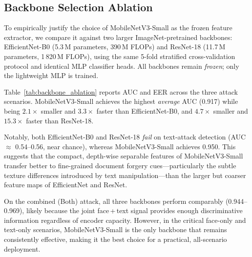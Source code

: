 
\subsection{Backbone Selection Ablation}
\label{sec:backbone_ablation}

To empirically justify the choice of MobileNetV3-Small as the frozen feature
extractor, we compare it against two larger ImageNet-pretrained backbones:
EfficientNet-B0 (5.3\,M parameters, 390\,M FLOPs) and ResNet-18
(11.7\,M parameters, 1\,820\,M FLOPs), using the same 5-fold stratified
cross-validation protocol and identical MLP classifier heads.
All backbones remain \emph{frozen}; only the lightweight MLP is trained.

Table~\ref{tab:backbone_ablation} reports AUC and EER across the three attack
scenarios.  MobileNetV3-Small achieves the highest \emph{average} AUC
(0.917) while being $2.1\times$ smaller and $3.3\times$ faster than
EfficientNet-B0, and $4.7\times$ smaller and $15.3\times$ faster than
ResNet-18.

Notably, both EfficientNet-B0 and ResNet-18 \emph{fail} on text-attack
detection (AUC $\approx$ 0.54--0.56, near chance), whereas MobileNetV3-Small
achieves 0.950.  This suggests that the compact, depth-wise separable
features of MobileNetV3-Small transfer better to fine-grained document
forgery cues---particularly the subtle texture differences introduced by
text manipulation---than the larger but coarser feature maps of EfficientNet
and ResNet.

On the combined (Both) attack, all three backbones perform comparably
(0.944--0.969), likely because the joint face\,+\,text signal provides
enough discriminative information regardless of encoder capacity.  However,
in the critical face-only and text-only scenarios, MobileNetV3-Small is
the only backbone that remains consistently effective, making it the best
choice for a practical, all-scenario deployment.

